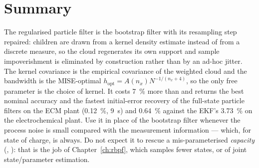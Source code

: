 \section{Summary}
The regularised particle filter is the bootstrap filter with its resampling step repaired: children
are drawn from a kernel density estimate instead of from a discrete measure, so the cloud
regenerates its own support and sample impoverishment is eliminated by construction rather than by
an ad-hoc jitter.  The kernel covariance is the empirical covariance of the weighted cloud and the
bandwidth is the MISE-optimal $h_{\mathrm{opt}} = A(n_x)N^{-1/(n_x+4)}$, so the only free parameter
is the choice of kernel.  It costs \SI{7}{\percent} more than  and returns the
best nominal accuracy and the fastest initial-error recovery of the full-state particle filters on
the ECM plant (\SI{0.12}{\percent}, \SI{9}{\second}) and \SI{0.64}{\percent} against the EKF's
\SI{3.73}{\percent} on the electrochemical plant.  Use it in place of the bootstrap filter whenever
the process noise is small compared with the measurement information --- which, for state of
charge, is always.  Do not expect it to rescue a mis-parameterised \emph{capacity}
(, ): that is the job of Chapter~\ref{ch:rbpf}, which samples
fewer states, or of joint state/parameter estimation.
